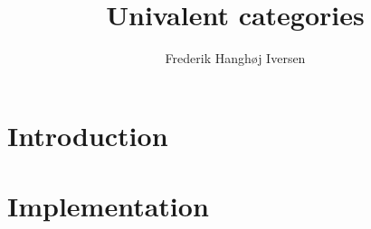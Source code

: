 \documentclass{report}
\title{Univalent categories}
\author{Frederik Hanghøj Iversen}
\begin{document}
\maketitle
\tableofcontents

\chapter{Introduction}


\chapter{Implementation}



\nocite{cubical-demo}
\nocite{coquand-2013}

\begin{appendices}
\end{appendices}
\end{document}
